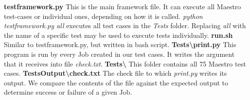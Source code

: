 \textbf{testframework.py}
\newline
\indent This is the main framework file. It can execute all Maestro test-cases
or individual ones, depending on how it is called.
\newline
\textit{python testframework.py all} executes all test cases in the
\textit{Tests} folder. Replacing \textit{all} with the name of a specific test
may be used to execute tests individually.
\newline
\newline
\textbf{run.sh}
\newline
\indent Similar to testframework.py, but written in bash script.
\newline
\newline
\textbf{Tests\textbackslash print.py}
\newline
\indent This program is run by every Job created in our test cases. It writes
the argument that it receives into file \textit{check.txt}.
\newline
\newline
\textbf{Tests\textbackslash}
\newline
\indent This folder contains all 75 Maestro test cases.
\newpage
\noindent\textbf{TestsOutput\textbackslash check.txt}
\newline
\indent The check file to which \textit{print.py} writes its output.
We compare the contents of the file against the expected output to determine
success or failure of a given Job.
\newline
\newline

